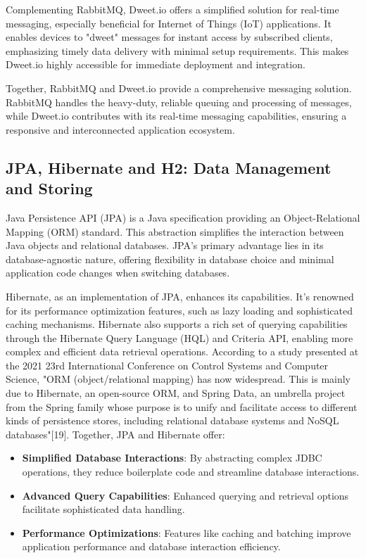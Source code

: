 Complementing RabbitMQ, Dweet.io offers a simplified solution for real-time messaging, especially beneficial for Internet of Things (IoT) applications. It enables devices to "dweet" messages for instant access by subscribed clients, emphasizing timely data delivery with minimal setup requirements. This makes Dweet.io highly accessible for immediate deployment and integration.

Together, RabbitMQ and Dweet.io provide a comprehensive messaging solution. RabbitMQ handles the heavy-duty, reliable queuing and processing of messages, while Dweet.io contributes with its real-time messaging capabilities, ensuring a responsive and interconnected application ecosystem.



\subsection{JPA, Hibernate and H2: Data Management and Storing}

Java Persistence API (JPA) is a Java specification providing an Object-Relational Mapping (ORM) standard. 
This abstraction simplifies the interaction between Java objects and relational databases. 
JPA's primary advantage lies in its database-agnostic nature, offering flexibility in database choice and minimal application code changes when switching databases.

Hibernate, as an implementation of JPA, enhances its capabilities. 
It's renowned for its performance optimization features, such as lazy loading and sophisticated caching mechanisms. 
Hibernate also supports a rich set of querying capabilities through the Hibernate Query Language (HQL) and Criteria API, enabling more complex and efficient data retrieval operations. 
According to a study presented at the 2021 23rd International Conference on Control Systems and Computer Science, "ORM (object/relational mapping) has now widespread. This is mainly due to Hibernate, an open-source ORM, and Spring Data, an umbrella project from the Spring family whose purpose is to unify and facilitate access to different kinds of persistence stores, including relational database systems and NoSQL databases"[19].
Together, JPA and Hibernate offer:

\begin{itemize}
  \item \textbf{Simplified Database Interactions}: By abstracting complex JDBC operations, they reduce boilerplate code and streamline database interactions.
  \item \textbf{Advanced Query Capabilities}: Enhanced querying and retrieval options facilitate sophisticated data handling.
  \item \textbf{Performance Optimizations}: Features like caching and batching improve application performance and database interaction efficiency.
\end{itemize}

